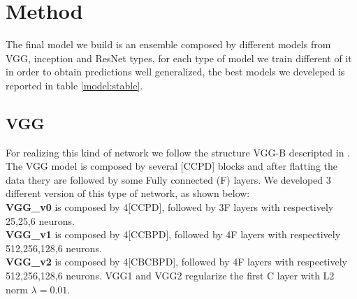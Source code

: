 \documentclass[10pt,twocolumn,letterpaper]{article}
\begin{document}
\section{Method}
The final model we build is an ensemble composed by different models from VGG, inception and ResNet types, for each type of model we train different of it in order to obtain predictions well generalized, the best models we develeped is reported in table \ref{model:stable}.
\subsection*{VGG}
For realizing this kind of network we follow the structure VGG-B descripted in \cite{24}. The VGG model is composed by several [CCPD] blocks and after flatting the data thery are followed by some Fully connected (F) layers. We developed 3 different version of this type of network, as shown below:
\\{\bf VGG\_v0} is composed by 4[CCPD], followed by 3F layers with respectively 25,25,6 neurons.
\\{\bf VGG\_v1} is composed by 4[CCBPD], followed by 4F layers with respectively 512,256,128,6 neurons.
\\{\bf VGG\_v2} is composed by 4[CBCBPD], followed by 4F layers with respectively 512,256,128,6 neurons.
VGG1 and VGG2 regularize the first C layer with L2 norm $\lambda=0.01$.
\end{document}
